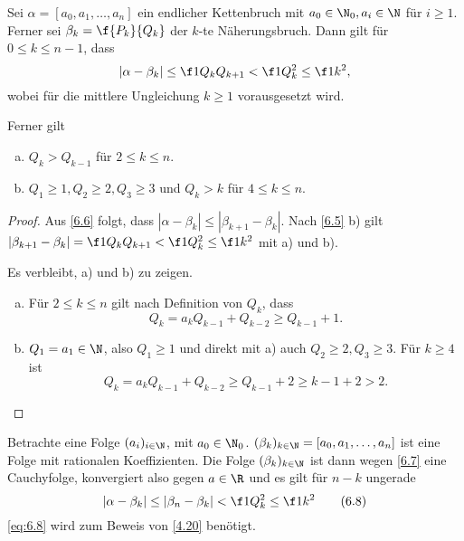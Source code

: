 \begin{st} \label{6.7}
	Sei $\alpha = [a_0, a_1, \dotsc, a_n]$ ein endlicher Kettenbruch mit $a_0 \in \N_0, a_i \in \N$ für $i \ge 1$.
	Ferner sei $\beta_k = \f {P_k}{Q_k}$ der $k$-te Näherungsbruch.
	Dann gilt für $0 \le k \le n-1$, dass
	\[
		| \alpha - \beta_k | \le \f 1{Q_k Q_{k+1}} < \f 1{Q_k^2} \le \f 1{k^2},
	\]
	wobei für die mittlere Ungleichung $k \ge 1$ vorausgesetzt wird.

	Ferner gilt
	\begin{enumerate}[a)]
		\item
			$Q_k > Q_{k-1}$ für $2 \le k \le n$.
		\item
			$Q_1 \ge 1, Q_2 \ge 2, Q_3 \ge 3$ und $Q_k > k$ für $4 \le k \le n$.
	\end{enumerate}
	\begin{proof}
		Aus \ref{6.6} folgt, dass $|\alpha - \beta_k| \le |\beta_{k+1} - \beta_k|$.
		Nach \ref{6.5} b) gilt $|\beta_{k+1} - \beta_k| = \f 1{Q_k Q_{k+1}} < \f 1{Q_k^2} \le \f 1{k^2}$ mit a) und b).

		Es verbleibt, a) und b) zu zeigen.
		\begin{enumerate}[a)]
			\item
				Für $2 \le k \le n$ gilt nach Definition von $Q_k$, dass
				\[
					Q_k = a_k Q_{k-1} + Q_{k-2}
					\ge Q_{k-1} + 1.
				\]
			\item
				$Q_1 = a_1 \in \N$, also $Q_1 \ge 1$ und direkt mit a) auch $Q_2 \ge 2, Q_3 \ge 3$.
				Für $k \ge 4$ ist
				\[
					Q_k = a_k Q_{k-1} + Q_{k-2}
					\ge Q_{k-1} + 2
					\ge k - 1 + 2
					> 2.
				\]
		\end{enumerate}
	\end{proof}
\end{st}

Betrachte eine Folge $(a_i)_{i \in \N}$, mit $a_0 \in \N_0$.
$(\beta_k)_{k\in\N} = [a_0, a_1, \dotsc, a_n]$ ist eine Folge mit rationalen Koeffizienten.
Die Folge $(\beta_k)_{k \in \N}$ ist dann wegen \ref{6.7} eine Cauchyfolge, konvergiert also gegen $a \in \R$ und es gilt für $n - k$ ungerade
\begin{equation}
	\label{eq:6.8}
	|\alpha - \beta_k| \le | \beta_n - \beta_k| < \f 1{Q_k^2} \le \f 1{k^2}
	\tag{6.8}
\end{equation}
\eqref{eq:6.8} wird zum Beweis von \ref{4.20} benötigt.


